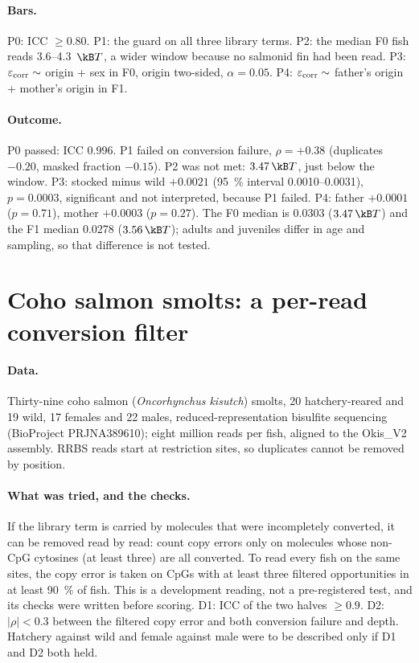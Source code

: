 \paragraph{Bars.} P0: ICC $\ge0.80$. P1: the guard on all three library terms. P2: the median F0 fish reads 3.6--4.3~$\kB T$, a
wider window because no salmonid fin had been read. P3: $\varepsilon_{\rm corr}\sim$ origin + sex in F0, origin two-sided,
$\alpha=0.05$. P4: $\varepsilon_{\rm corr}\sim$ father's origin + mother's origin in F1.

\paragraph{Outcome.} P0 passed: ICC 0.996. P1 failed on conversion failure, $\rho=+0.38$ (duplicates $-0.20$, masked fraction
$-0.15$). P2 was not met: $3.47\,\kB T$, just below the window. P3: stocked minus wild $+0.0021$ (95~\% interval 0.0010--0.0031),
$p=0.0003$, significant and not interpreted, because P1 failed. P4: father $+0.0001$ ($p=0.71$), mother $+0.0003$ ($p=0.27$).
The F0 median is 0.0303 ($3.47\,\kB T$) and the F1 median 0.0278 ($3.56\,\kB T$); adults and juveniles differ in age and sampling,
so that difference is not tested. \measured

\section{Coho salmon smolts: a per-read conversion filter}

\paragraph{Data.} Thirty-nine coho salmon (\emph{Oncorhynchus kisutch}) smolts, 20 hatchery-reared and 19 wild, 17 females and 22
males, reduced-representation bisulfite sequencing~\cite{LeLuyer2017} (BioProject PRJNA389610); eight million reads per fish,
aligned to the Okis\_V2 assembly. RRBS reads start at restriction sites, so duplicates cannot be removed by position.

\paragraph{What was tried, and the checks.} If the library term is carried by molecules that were incompletely converted, it can
be removed read by read: count copy errors only on molecules whose non-CpG cytosines (at least three) are all converted. To read
every fish on the same sites, the copy error is taken on CpGs with at least three filtered opportunities in at least 90~\% of
fish. This is a development reading, not a pre-registered test, and its checks were written before scoring. D1: ICC of the two
halves $\ge0.9$. D2: $|\rho|<0.3$ between the filtered copy error and both conversion failure and depth. Hatchery against wild
and female against male were to be described only if D1 and D2 both held.

